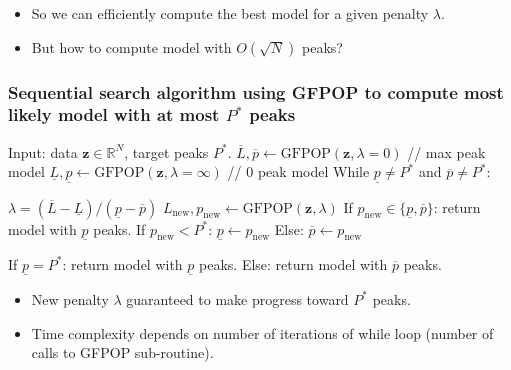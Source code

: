 \documentclass[t]{beamer}
\newcommand{\RR}{\mathbb R}
\begin{document}
\begin{frame}[fragile]
\vskip 0.5cm
\begin{itemize}
\item So we can efficiently compute the best model for a given penalty
  $\lambda$.
\item But how to compute model with $O(\sqrt N)$ peaks?
\end{itemize}

\end{frame}

\begin{frame}
  \frametitle{Sequential search algorithm using GFPOP to compute most
    likely model with at most $P^*$ peaks}
  \begin{algorithmic}[1]
  \STATE Input: data $\mathbf z\in\RR^N$, target peaks $P^*$.
  \STATE $\overline L,\overline p \gets \text{GFPOP}(\mathbf z, \lambda=0)$ // max peak model
  \STATE $\underline L,\underline p \gets \text{GFPOP}(\mathbf z, \lambda=\infty)$ // 0 peak model
  \STATE While $\underline p\neq P^*$ and $\overline p\neq P^*$:
  \begin{ALC@g}
    \STATE \alert{$\lambda=(\overline L-\underline L)/(\underline p-\overline p)$}
    \STATE $L_{\text{new}},p_{\text{new}}\gets\text{GFPOP}(\mathbf z, \lambda)$
    \STATE If $p_{\text{new}}\in\{\underline p, \overline p\}$: return model with $\underline p$ peaks.
    \STATE If $p_{\text{new}} < P^*$: $\underline p\gets p_{\text{new}}$
    \STATE Else: $\overline p\gets p_{\text{new}}$
  \end{ALC@g}
  \STATE If $\underline p=P^*$: return model with $\underline p$ peaks.
  \STATE Else: return model with $\overline p$ peaks.
  \end{algorithmic}
\begin{itemize}
\item \alert{New penalty $\lambda$} guaranteed to make progress toward $P^*$ peaks.
\item Time complexity depends on number of iterations of while loop
  (number of calls to GFPOP sub-routine).
\end{itemize}
\end{frame}
\end{document}
